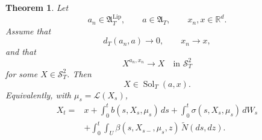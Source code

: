 \documentclass[12pt,oneside, reqno]{amsart}
\newtheorem{theorem}{Theorem}[section]
\numberwithin{equation}{section}
\begin{document}
	\begin{theorem}
		\label{thm:closed-graph-solution-relation}
		Let
		\[
		a_n\in\mathfrak A_T^{\mathrm{Lip}},
		\qquad
		a\in\mathfrak A_T,
		\qquad
		x_n,x\in\mathbb R^d.
		\]
		Assume that
		\[
		d_T(a_n,a)\longrightarrow0,
		\qquad
		x_n\longrightarrow x,
		\]
		and that
		\[
		X^{a_n,x_n}\longrightarrow X
		\quad\text{in }\mathcal S_T^2
		\]
		for some $X\in\mathcal S_T^2$. Then
		\[
		X\in\operatorname{Sol}_T(a,x).
		\]
		Equivalently, with $\mu_s=\mathcal L(X_s)$,
		\[
		\begin{aligned}
			X_t
			={}&
			x
			+\int_0^t b(s,X_s,\mu_s)\,ds
			+\int_0^t\sigma(s,X_s,\mu_s)\,dW_s
			\\
			&+
			\int_0^t\int_U
			\beta(s,X_{s-},\mu_s,z)\,
			\widetilde N(ds,dz).
		\end{aligned}
		\]
	\end{theorem}
	
\end{document}
